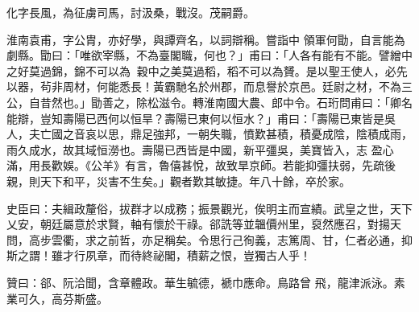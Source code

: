 \begin{pinyinscope}
 化字長風，為征虜司馬，討汲桑，戰沒。茂嗣爵。



 淮南袁甫，字公胄，亦好學，與譚齊名，以詞辯稱。嘗詣中
 領軍何勖，自言能為劇縣。勖曰：「唯欲宰縣，不為臺閣職，何也？」甫曰：「人各有能有不能。譬繒中之好莫過錦，錦不可以為；穀中之美莫過稻，稻不可以為贇。是以聖王使人，必先以器，茍非周材，何能悉長！黃霸馳名於州郡，而息譽於京邑。廷尉之材，不為三公，自昔然也。」勖善之，除松滋令。轉淮南國大農、郎中令。石珩問甫曰：「卿名能辯，豈知壽陽已西何以恒旱？壽陽已東何以恒水？」甫曰：「壽陽已東皆是吳人，夫亡國之音哀以思，鼎足強邦，一朝失職，憤歎甚積，積憂成陰，陰積成雨，雨久成水，故其域恒澇也。壽陽已西皆是中國，新平彊吳，美寶皆入，志
 盈心滿，用長歡娛。《公羊》有言，魯僖甚悅，故致旱京師。若能抑彊扶弱，先疏後親，則天下和平，災害不生矣。」觀者歎其敏捷。年八十餘，卒於家。



 史臣曰：夫緝政釐俗，拔群才以成務；振景觀光，俟明主而宣績。武皇之世，天下乂安，朝廷屬意於求賢，軸有懷於干祿。郤詵等並韞價州里，裒然應召，對揚天問，高步雲衢，求之前哲，亦足稱矣。令思行己徇義，志篤周、甘，仁者必通，抑斯之謂！雖才行夙章，而待終祕閣，積薪之恨，豈獨古人乎！



 贊曰：郤、阮洽聞，含章體政。華生毓德，褫巾應命。鳥路曾
 飛，龍津派泳。素業可久，高芬斯盛。



\end{pinyinscope}